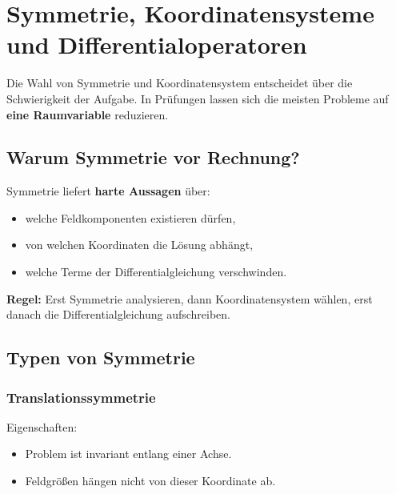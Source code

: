 \documentclass[a4paper]{article}
\newcommand{\imp}[1]{{\color{accent}\bfseries #1}}
\begin{document}
\section{Symmetrie, Koordinatensysteme und Differentialoperatoren}

\begin{merke}
Die Wahl von Symmetrie und Koordinatensystem entscheidet über die Schwierigkeit der Aufgabe.
In Prüfungen lassen sich die meisten Probleme auf \imp{eine Raumvariable} reduzieren.
\end{merke}

\subsection{Warum Symmetrie vor Rechnung?}

Symmetrie liefert \imp{harte Aussagen} über:
\begin{itemize}
  \item welche Feldkomponenten existieren dürfen,
  \item von welchen Koordinaten die Lösung abhängt,
  \item welche Terme der Differentialgleichung verschwinden.
\end{itemize}

\begin{schema}
\imp{Regel:}
Erst Symmetrie analysieren, dann Koordinatensystem wählen,
erst danach die Differentialgleichung aufschreiben.
\end{schema}

\subsection{Typen von Symmetrie}

\subsubsection{Translationssymmetrie}

Eigenschaften:
\begin{itemize}
  \item Problem ist invariant entlang einer Achse.
  \item Feldgrößen hängen nicht von dieser Koordinate ab.
\end{itemize}
\end{document}
